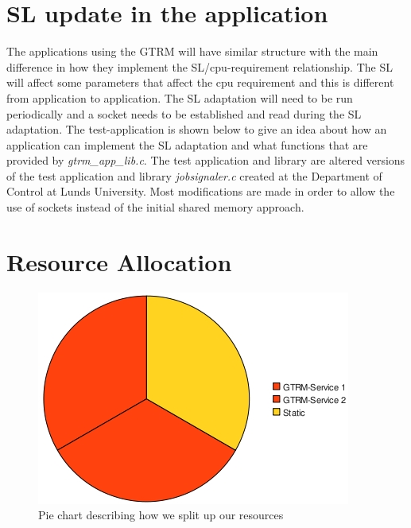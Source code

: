 \documentclass[nobiblatex]{LTHthesis}
\begin{document}
\section{SL update in the application}
The applications using the GTRM will have similar structure with the main difference in how they implement the SL/cpu-requirement relationship. 
The SL will affect some parameters that affect the cpu requirement and this is different from application to application. 
The SL adaptation will need to be run periodically and a socket needs to be established and read during the SL adaptation. 
The test-application is shown below to give an idea about how an application can implement the SL adaptation and what functions that are provided by \emph{gtrm\_app\_lib.c}.
The test application and library are altered versions of the test application and library \emph{jobsignaler.c} created at the Department of Control at Lunds University.
Most modifications are made in order to allow the use of  sockets instead of the initial shared memory approach.


















\section{Resource Allocation}
\begin{figure}
    \centering
    \includegraphics{piechart.jpeg}
    \caption{Pie chart describing how we split up our resources}
    \label{fig:Piechart}
\end{figure}
\end{document}
